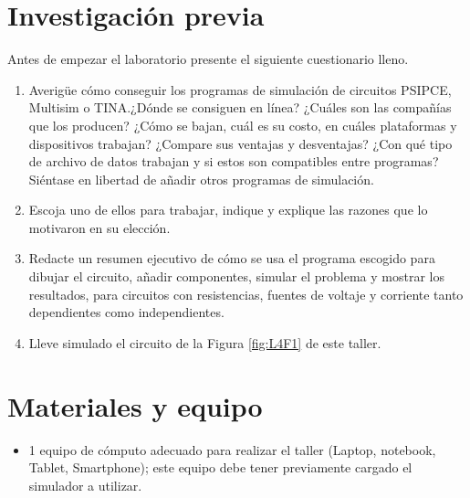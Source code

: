 \documentclass{report}
\newcommand{\inv}{Investigación previa}
\newcommand{\mat}{Materiales y equipo}
\newcommand{\antesde}{Antes de empezar el laboratorio presente el siguiente cuestionario lleno.}
\begin{document}
\section{\inv}
\antesde
\begin{enumerate}
\item	Averigüe cómo conseguir los programas de simulación de circuitos PSIPCE, Multisim o TINA.¿Dónde se consiguen en línea? ¿Cuáles son las compañías que los producen? ¿Cómo se bajan, cuál es su costo, en cuáles plataformas y dispositivos trabajan? ¿Compare sus ventajas y desventajas? ¿Con qué tipo de archivo de datos trabajan y si estos son compatibles entre programas? Siéntase en libertad de añadir otros programas de simulación.
\item	Escoja uno de ellos para trabajar, indique y explique las razones que lo motivaron en su elección.
\item	Redacte un resumen ejecutivo de cómo se usa el programa escogido para dibujar el circuito, añadir componentes, simular el problema y mostrar los resultados, para circuitos con resistencias, fuentes de voltaje y corriente tanto dependientes como independientes.
\item	Lleve simulado el circuito de la Figura \ref{fig:L4F1} de este taller.
\end{enumerate}
\section{\mat}
\begin{itemize}
\item 1 equipo de cómputo adecuado para realizar el taller (Laptop, notebook, Tablet, Smartphone); este equipo debe tener previamente cargado el simulador a utilizar.
\end{itemize}
\end{document}
